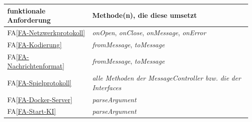 \documentclass[12pt]{article}
\newcounter{fa}
\newcommand{\mfaref}[1]{FA\ref{#1}}
\begin{document}
\begin{tabularx}{\linewidth}{l|X}
	\textbf{funktionale Anforderung} & \textbf{Methode(n), die diese umsetzt} \\ \hline
	\mfaref{FA-Netzwerkprotokoll} & \textit{onOpen}, \textit{onClose}, \textit{onMessage}, \textit{onError} \\	
	\mfaref{FA-Kodierung} & \textit{fromMessage}, \textit{toMessage} \\
	\mfaref{FA-Nachrichtenformat} & \textit{fromMessage}, \textit{toMessage} \\ 
	\mfaref{FA-Spielprotokoll} & \textit{alle Methoden der MessageController bzw. die der Interfaces} \\  
	\mfaref{FA-Docker-Server} & \textit{parseArgument} \\ 
	\mfaref{FA-Start-KI} & \textit{parseArgument} \\ 
\end{tabularx}

\vspace{2cm}
\end{document}
